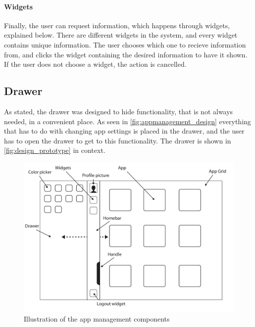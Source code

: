 \paragraph{Widgets} Finally, the user can request information, which happens through widgets, explained below. 
There are different widgets in the system, and every widget contains unique information.
The user chooses which one to recieve information from, and clicks the widget containing the desired information to have it shown. 
If the user does not choose a widget, the action is cancelled. 

\subsection{Drawer}
\label{sec:drawer}
As stated, the drawer was designed to hide functionality, that is not always needed, in a convenient place. 
As seen in \autoref{fig:appmanagement_design} everything that has to do with changing app settings is placed in the drawer, and the user has to open the drawer to get to this functionality.
The drawer is shown in \autoref{fig:design_prototype} in context.

\begin{figure}[!h]
	\centering
	\includegraphics[width=1\textwidth]{gfx/design_prototype.pdf}
	\caption{Illustration of the app management components}
	\label{fig:design_prototype}
\end{figure}

